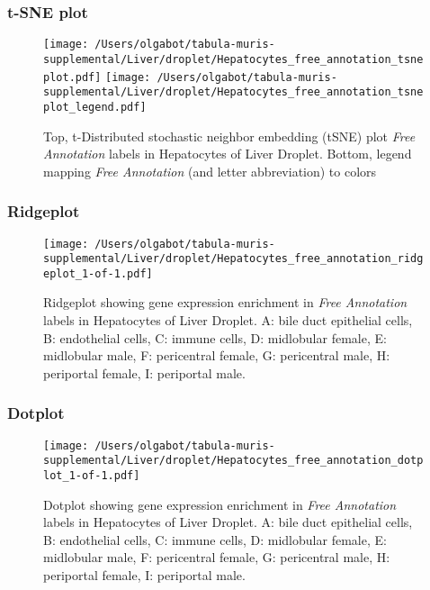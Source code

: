 \clearpage
\subsubsection{t-SNE plot}
\begin{figure}[h]
\centering
\texttt{[image: /Users/olgabot/tabula-muris-supplemental/Liver/droplet/Hepatocytes\_free\_annotation\_tsneplot.pdf]}
\texttt{[image: /Users/olgabot/tabula-muris-supplemental/Liver/droplet/Hepatocytes\_free\_annotation\_tsneplot\_legend.pdf]}
\caption{Top, t-Distributed stochastic neighbor embedding (tSNE) plot  \emph{Free Annotation} labels in Hepatocytes of Liver Droplet. Bottom, legend mapping \emph{Free Annotation} (and letter abbreviation) to colors}
\end{figure}


\clearpage

\subsubsection{Ridgeplot}
\begin{figure}[h]
\centering
\texttt{[image: /Users/olgabot/tabula-muris-supplemental/Liver/droplet/Hepatocytes\_free\_annotation\_ridgeplot\_1-of-1.pdf]}

\caption{ Ridgeplot  showing gene expression enrichment in \emph{Free Annotation} labels in Hepatocytes of Liver Droplet. A: bile duct epithelial cells, B: endothelial cells, C: immune cells, D: midlobular female, E: midlobular male, F: pericentral female, G: pericentral male, H: periportal female, I: periportal male.}
\end{figure}


\clearpage

\subsubsection{Dotplot}
\begin{figure}[h]
\centering
\texttt{[image: /Users/olgabot/tabula-muris-supplemental/Liver/droplet/Hepatocytes\_free\_annotation\_dotplot\_1-of-1.pdf]}

\caption{ Dotplot  showing gene expression enrichment in \emph{Free Annotation} labels in Hepatocytes of Liver Droplet. A: bile duct epithelial cells, B: endothelial cells, C: immune cells, D: midlobular female, E: midlobular male, F: pericentral female, G: pericentral male, H: periportal female, I: periportal male.}
\end{figure}


